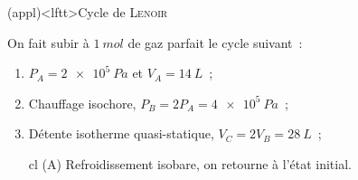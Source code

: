 \documentclass[../../main/main.tex]{subfiles}
\begin{document}
\begin{tcb*}[breakable](appl)<lftt>{Cycle de \textsc{Lenoir}}
	\begin{isd}[righthand ratio=.40]
		On fait subir à $\SI{1}{mol}$ de gaz parfait le cycle suivant~:
		\begin{enumerate}[label=\clalphi]
			\item $P_A = \SI{2e5}{Pa}$ et $V_A = \SI{14}{L}$~;
			\item Chauffage isochore, $P_B = 2P_A = \SI{4e5}{Pa}$~;
			\item Détente isotherme quasi-statique, $V_C = 2V_B = \SI{28}{L}$~;
			      \item[cl](A) Refroidissement isobare, on retourne à l'état initial.
		\end{enumerate}
		\tcblower
		\begin{center}
\end{center}
\end{isd}
\end{tcb*}
\end{document}

